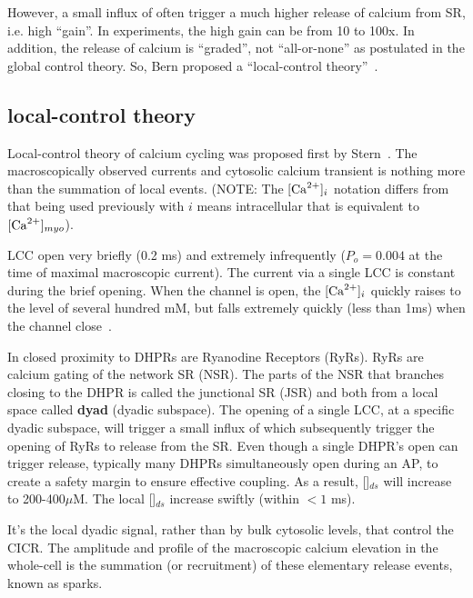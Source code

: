 However, a small influx of  often trigger a much higher
release of calcium from SR, i.e. high ``gain''. In experiments, the
high gain can be from 10 to 100x. In addition, the release of calcium
is ``graded'', not ``all-or-none'' as postulated in the global control
theory. So, Bern proposed a ``local-control
theory''~\citep{stern1992tec}.

\subsection{local-control theory}
\label{sec:local-control-theory}

Local-control theory of calcium cycling was proposed first by
Stern~\citep{stern1992tec}. The macroscopically observed 
currents and cytosolic calcium transient is nothing more than the
summation of local events.  (NOTE: The $[\ce{Ca^2+}]_i$ notation
differs from that being used previously with $i$ means intracellular
that is equivalent to $[\ce{Ca^2+}]_{myo}$).

\begin{framed}
  LCC open very briefly (0.2 ms) and extremely infrequently
  ($P_o=0.004$ at the time of maximal macroscopic current). The
  current via a single LCC is constant during the brief opening. When
  the channel is open, the $[\ce{Ca^2+}]_i$ quickly raises to the
  level of several hundred mM, but falls extremely quickly (less than
  1ms) when the channel close~\citep{wier1994lce}. 
\end{framed}

In closed proximity to DHPRs are Ryanodine Receptors (RyRs). RyRs are
calcium gating of the network SR (NSR). The parts of the NSR that
branches closing to the DHPR is called the junctional SR (JSR) and
both from a local space called {\bf dyad} (dyadic subspace).  The
opening of a single LCC, at a specific dyadic subspace, will trigger a
small influx of  which subsequently trigger the opening of
RyRs to release  from the SR. Even though a single DHPR's
open can trigger  release, typically many DHPRs
simultaneously open during an AP, to create a safety margin to ensure
effective coupling. As a result, []$_{ds}$ will increase to
200-400$\mu$M.  The local []$_{ds}$ increase swiftly (within
$<1$ ms). 

\begin{framed}
  It's the local dyadic  signal, rather than by bulk
  cytosolic  levels, that control the CICR. The amplitude
  and profile of the macroscopic calcium elevation in the whole-cell
  is the summation (or recruitment) of these elementary 
  release events, known as  sparks.
\end{framed}

